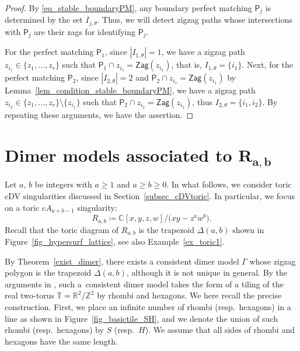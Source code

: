 \documentclass[pdftex]{sigma}
\numberwithin{equation}{section}
\theoremstyle{definition}
\newcommand{\ZZ}{\mathbb{Z}}
\newcommand{\RR}{\mathbb{R}}
\newcommand{\CC}{\mathbb{C}}
\newcommand{\TT}{\mathbb{T}}
\newcommand{\sfP}{\mathsf{P}}
\newcommand{\Zag}{\mathsf{Zag}}
\begin{document}
\begin{proof}
By \eqref{eq_stable_boundaryPM}, any boundary perfect matching $\sfP_j$ is determined by the set $I_{j,\theta}$.
Thus, we will detect zigzag paths whose intersections with $\sfP_j$ are their zags for identifying $\sfP_j$.

For the perfect matching $\sfP_1$, since $|I_{1,\theta}|=1$, we have a zigzag path $z_{i_1}\in\{z_1,\dots,z_r\}$ such that $\sfP_1\cap z_{i_1}=\Zag(z_{i_1})$,
that is, $I_{1,\theta}=\{i_1\}$.
Next, for the perfect matching $\sfP_2$,
since $|I_{2,\theta}|=2$ and $\sfP_2\cap z_{i_1}=\Zag(z_{i_1})$ by Lemma~\ref{lem_condition_stable_boundaryPM},
we have a zigzag path $z_{i_2}\in\{z_1,\dots,z_r\}{\setminus}\{z_{i_1}\}$ such that $\sfP_2\cap z_{i_2}=\Zag(z_{i_2})$,
thus $I_{2,\theta}=\{i_1,i_2\}$.
By repeating these arguments, we have the assertion.
\end{proof}

\section[Dimer models associated to R\_{a,b}]{Dimer models associated to $\boldsymbol{R_{a,b}}$}
\label{sec_dimer_ab}

Let $a$, $b$ be integers with $a\ge 1$ and $a\ge b\ge0$.
In what follows, we consider toric cDV singularities discussed in Section~\ref{subsec_cDVtoric}.
In particular, we focus on a toric $cA_{a+b-1}$ singularity:
\[
R_{a,b}\coloneqq \CC[x,y,z,w]/\bigl(xy-z^aw^b\bigr).
\]
Recall that the toric diagram of $R_{a,b}$ is the trapezoid $\Delta(a,b)$ shown in Figure~\ref{fig_hypersurf_lattice},
see also Example~\ref{ex_toric1}.

By Theorem~\ref{exist_dimer}, there exists a consistent dimer model $\Gamma$ whose zigzag polygon is the trapezoid $\Delta(a,b)$,
although it is not unique in general.
By the arguments in \cite[Section~1.2]{Nag}, such a~consistent dimer model takes the form of a tiling of the real two-torus $\TT=\RR^2/\ZZ^2$
by rhombi and hexagons.
We here recall the precise construction.
First, we place an infinite number of rhombi (resp.\ hexagons) in a line as shown in Figure~\ref{fig_basictile_SH},
and we denote the union of such rhombi (resp.\ hexagons) by $S$ (resp.\ $H$). We assume that all sides of rhombi and hexagons have the same length.
\end{document}

